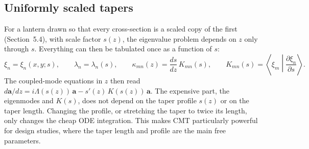 \documentclass[11pt,a4paper]{article}
\begin{document}
\subsection{Uniformly scaled tapers}
For a lantern drawn so that every cross-section is a scaled copy of the first (Section~5.4), with scale factor $s(z)$, the eigenvalue problem depends on $z$ only through $s$. Everything can then be tabulated once as a function of $s$:
\begin{equation}
\xi_n = \xi_n(x,y;s),
\qquad
\lambda_n = \lambda_n(s),
\qquad
\kappa_{mn}(z) = \frac{ds}{dz}\, K_{mn}(s),
\qquad
K_{mn}(s) = \left\langle \xi_m \middle| \frac{\partial \xi_n}{\partial s} \right\rangle.
\label{eq:scaled_taper}
\end{equation}
The coupled-mode equations in $z$ then read $d\mathbf{a}/dz = i\Lambda(s(z))\,\mathbf{a} - s'(z)\,K(s(z))\,\mathbf{a}$. The expensive part, the eigenmodes and $K(s)$, does not depend on the taper profile $s(z)$ or on the taper length. Changing the profile, or stretching the taper to twice its length, only changes the cheap ODE integration. This makes CMT particularly powerful for design studies, where the taper length and profile are the main free parameters.
\end{document}
